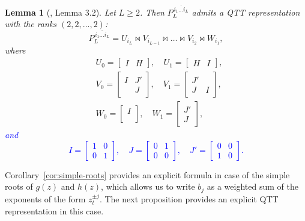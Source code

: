 \documentclass[a4paper]{article}
\newtheorem{lemma}{Lemma}[section]
\newcommand{\perm}{P}
\newcommand{\LL}{L}
\begin{document}
\begin{lemma}[\cite{khkaz-conv-2013}, Lemma 3.2] \label{lm:perm}
Let $\LL \geq 2$. Then $\perm_\LL^{\,\overline{i_1\dots i_\LL}}$ admits a QTT representation with the ranks $(2,2,\dots,2)$:
\[
    \perm_\LL^{\,\overline{i_1\dots i_\LL}} = U_{i_\LL} \Join V_{i_{\LL-1}} \Join \dots \Join V_{i_{2}} \Join W_{i_1},
\]
where
\[
\begin{split}
    &U_0 = 
    \begin{bmatrix}
        I & H
    \end{bmatrix},
    \quad
    U_1 = 
    \begin{bmatrix}
        H & I
    \end{bmatrix},
    \\
    &V_0 = 
    \begin{bmatrix}
        I & J' \\
         & J
    \end{bmatrix},
    \quad
    V_1 = 
    \begin{bmatrix}
        J' &  \\
        J  & I 
    \end{bmatrix},
    \\
    &W_0 = 
    \begin{bmatrix}
        I  \\ \\
    \end{bmatrix},
    \quad
    W_1 = 
    \begin{bmatrix}
        J' \\ J
    \end{bmatrix},
\end{split}
\]
\textcolor{blue}{and \[I = \begin{bmatrix}1 & 0 \\ 0 & 1 \end{bmatrix}, \quad J = \begin{bmatrix}0 & 1 \\ 0 & 0 \end{bmatrix},\quad J' = \begin{bmatrix}0 & 0 \\ 1 & 0 \end{bmatrix}.\]}
\end{lemma}

Corollary~\ref{cor:simple-roots} provides an explicit formula in case of the simple roots of $g(z)$ and $h(z)$, which allows us to write $b_j$ as a weighted sum of the exponents of the form $z_t^{\pm j}$.
The next proposition provides an explicit QTT representation in this case.
\end{document}
